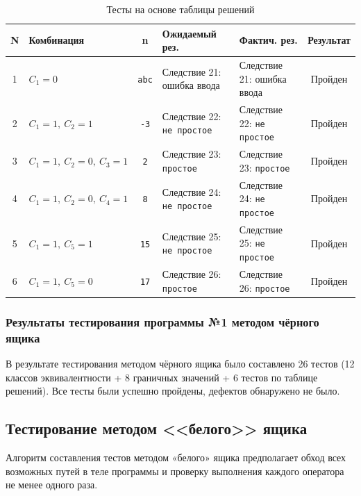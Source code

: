 \documentclass{article}[14pt]
\begin{document}
\begin{table}[H]
\centering
\caption{Тесты на основе таблицы решений}
\renewcommand{\arraystretch}{1.5}
\begin{tabular}{|c|p{4.2cm}|c|p{3.5cm}|p{3.5cm}|c|}
\hline
\textbf{N} & \textbf{Комбинация} & \textbf{n} & \textbf{Ожидаемый рез.} & \textbf{Фактич. рез.} & \textbf{Результат} \\
\hline
1 & $C_1=0$ & \texttt{abc} & Следствие 21: ошибка ввода & Следствие 21: ошибка ввода & Пройден \\
\hline
2 & $C_1=1,\ C_2=1$ & \texttt{-3} & Следствие 22: \texttt{не простое} & Следствие 22: \texttt{не простое} & Пройден \\
\hline
3 & $C_1=1,\ C_2=0,\ C_3=1$ & \texttt{2} & Следствие 23: \texttt{простое} & Следствие 23: \texttt{простое} & Пройден \\
\hline
4 & $C_1=1,\ C_2=0,\ C_4=1$ & \texttt{8} & Следствие 24: \texttt{не простое} & Следствие 24: \texttt{не простое} & Пройден \\
\hline
5 & $C_1=1,\ C_5=1$ & \texttt{15} & Следствие 25: \texttt{не простое} & Следствие 25: \texttt{не простое} & Пройден \\
\hline
6 & $C_1=1,\ C_5=0$ & \texttt{17} & Следствие 26: \texttt{простое} & Следствие 26: \texttt{простое} & Пройден \\
\hline
\end{tabular}
\end{table}

\subsubsection{Результаты тестирования программы №1 методом чёрного ящика}

В результате тестирования методом чёрного ящика было составлено 26 тестов
(12 классов эквивалентности + 8 граничных значений + 6 тестов по таблице решений). 
Все тесты были успешно пройдены, дефектов обнаружено не было.

\subsection{Тестирование методом <<белого>> ящика}

Алгоритм составления тестов методом «белого» ящика предполагает обход всех возможных путей
в теле программы и проверку выполнения каждого оператора не менее одного раза.
\end{document}
